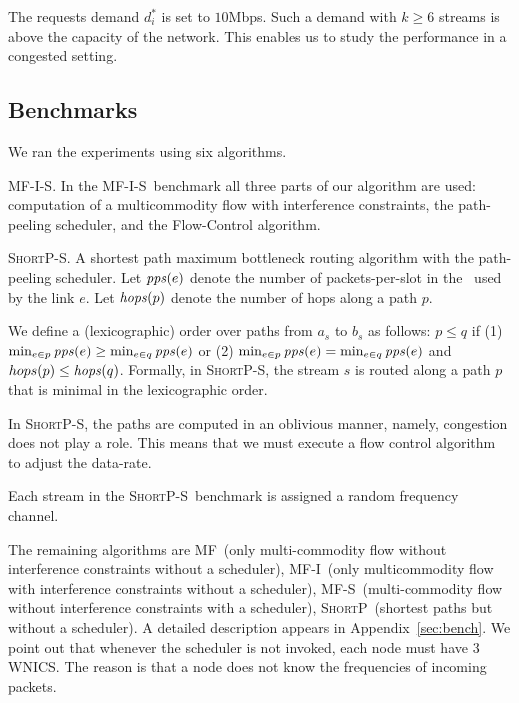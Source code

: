 \documentclass[11pt]{article}
\newenvironment{proof sketch}[1]{\noindent {\emph{Proof sketch of #1:}}}{\hfill \qed}
\newcommand{\pps}{\text{\emph{pps}}}
\newcommand{\hops}{\text{\emph{hops}}}
\newcommand{\MCS}{\text{\sc{mcs}}}
\newcommand{\algA}{\textsc{MF-I-S}}
\newcommand{\algB}{\textsc{ShortP}}
\newcommand{\algBS}{\textsc{ShortP-S}}
\newcommand{\algC}{\textsc{MF-I}}
\newcommand{\algD}{\textsc{MF}}
\newcommand{\algE}{\textsc{MF-S}}
\begin{document}
The requests demand $d^*_i$ is set to $10$Mbps. Such a demand with
$k\geq 6$ streams is above the capacity of the network. This enables
us to study the performance in a congested setting.


\subsection{Benchmarks}
We ran the experiments using six algorithms.
\begin{inparaenum}[(1)]%
\item \algA. In the \algA\ benchmark all three parts of our algorithm
  are used: computation of a multicommodity flow with interference
  constraints, the path-peeling scheduler, and the Flow-Control
  algorithm.

\item \algBS. A shortest path maximum bottleneck routing algorithm
  with the path-peeling scheduler.  Let $\pps(e)$ denote the number of
  packets-per-slot in the \MCS\ used by the link $e$.  Let $\hops(p)$
  denote the number of hops along a path $p$.

  We define a (lexicographic) order over paths from $a_s$ to $b_s$ as
  follows: $p \leq q$ if (1) $\min_{e\in p} \pps(e) \geq \min_{e\in q}
  \pps(e)$ or (2) $\min_{e \in p} \pps(e) = \min_{e \in q} \pps(e)$
  and $hops(p) \leq \hops(q)$.  Formally, in \algBS, the stream $s$ is
  routed along a path $p$ that is minimal in the lexicographic order.

  In \algBS, the paths are computed in an oblivious manner, namely,
  congestion does not play a role. This means that we must execute a
  flow control algorithm to adjust the data-rate.

  Each stream in the \algBS\ benchmark is assigned a random frequency
  channel.
\item The remaining algorithms are \algD\ (only multi-commodity flow
  without interference constraints without a scheduler), \algC\ (only
  multicommodity flow with interference constraints without a
  scheduler), \algE\ (multi-commodity flow without interference
  constraints with a scheduler), \algB\ (shortest paths but without a
  scheduler).  A detailed description appears in
  Appendix~\ref{sec:bench}. We point out that whenever the scheduler
  is not invoked, each node must have $3$ WNICS. The reason is that a
  node does not know the frequencies of incoming packets.
\end{inparaenum}%
\end{document}
